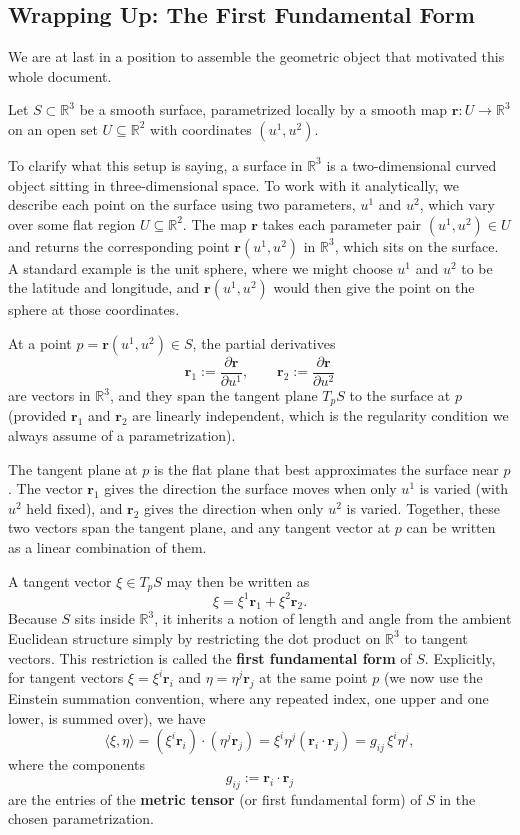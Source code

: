\documentclass{article}
\begin{document}
\subsection{Wrapping Up: The First Fundamental Form}
 
We are at last in a position to assemble the geometric object that motivated this whole document.
 
Let $S \subset \mathbb{R}^3$ be a smooth surface, parametrized locally by a smooth map $\mathbf{r}: U \to \mathbb{R}^3$ on an open set $U \subseteq \mathbb{R}^2$ with coordinates $(u^1, u^2)$.
 
To clarify what this setup is saying, a surface in $\mathbb{R}^3$ is a two-dimensional curved object sitting in three-dimensional space. To work with it analytically, we describe each point on the surface using two parameters, $u^1$ and $u^2$, which vary over some flat region $U \subseteq \mathbb{R}^2$. The map $\mathbf{r}$ takes each parameter pair $(u^1, u^2) \in U$ and returns the corresponding point $\mathbf{r}(u^1, u^2)$ in $\mathbb{R}^3$, which sits on the surface. A standard example is the unit sphere, where we might choose $u^1$ and $u^2$ to be the latitude and longitude, and $\mathbf{r}(u^1, u^2)$ would then give the point on the sphere at those coordinates.
 
At a point $p = \mathbf{r}(u^1, u^2) \in S$, the partial derivatives
$$\mathbf{r}_1 := \frac{\partial \mathbf{r}}{\partial u^1}, \qquad \mathbf{r}_2 := \frac{\partial \mathbf{r}}{\partial u^2}$$
are vectors in $\mathbb{R}^3$, and they span the tangent plane $T_p S$ to the surface at $p$ (provided $\mathbf{r}_1$ and $\mathbf{r}_2$ are linearly independent, which is the regularity condition we always assume of a parametrization).
 
The tangent plane at $p$ is the flat plane that best approximates the surface near $p$. The vector $\mathbf{r}_1$ gives the direction the surface moves when only $u^1$ is varied (with $u^2$ held fixed), and $\mathbf{r}_2$ gives the direction when only $u^2$ is varied. Together, these two vectors span the tangent plane, and any tangent vector at $p$ can be written as a linear combination of them.
 
A tangent vector $\xi \in T_p S$ may then be written as
$$\xi = \xi^1 \mathbf{r}_1 + \xi^2 \mathbf{r}_2.$$
Because $S$ sits inside $\mathbb{R}^3$, it inherits a notion of length and angle from the ambient Euclidean structure simply by restricting the dot product on $\mathbb{R}^3$ to tangent vectors. This restriction is called the \textbf{first fundamental form} of $S$. Explicitly, for tangent vectors $\xi = \xi^i \mathbf{r}_i$ and $\eta = \eta^j \mathbf{r}_j$ at the same point $p$ (we now use the Einstein summation convention, where any repeated index, one upper and one lower, is summed over), we have
$$\langle \xi, \eta \rangle = (\xi^i \mathbf{r}_i) \cdot (\eta^j \mathbf{r}_j) = \xi^i \eta^j (\mathbf{r}_i \cdot \mathbf{r}_j) = g_{ij}\, \xi^i \eta^j,$$
 where the components
$$g_{ij} := \mathbf{r}_i \cdot \mathbf{r}_j$$
are the entries of the \textbf{metric tensor} (or first fundamental form) of $S$ in the chosen parametrization.
\end{document}
